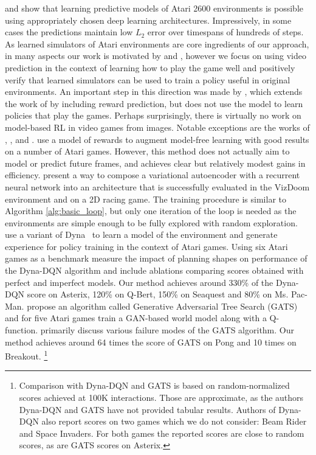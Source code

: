 \citet{video_prediction} and \citet{recurrent} show that learning predictive models of Atari 2600 environments is possible using appropriately chosen deep learning architectures. Impressively, in some cases the predictions maintain low $L_2$ error over timespans of hundreds of steps. 
As learned simulators of Atari environments are core ingredients of our approach, in many aspects our work is motivated by \citet{video_prediction} and \citet{recurrent}, however we focus on using video prediction in the context of learning how to play the game well and positively verify that learned simulators can be used to train a policy useful in original environments.
An important step in this direction was made by \citet{video_reward_prediction}, which extends the work of \citet{video_prediction} by including reward prediction, but does not use the model to learn policies that play the games.
Perhaps surprisingly, there is virtually no work on model-based RL in video games from images.
Notable exceptions are the works of
\citet{vpn}, \citet{world_models}, \citet{dyna_dqn} and \citet{gats}. \citet{vpn} use a model of rewards to augment model-free learning with good results on a number of Atari games. However, this method does not actually aim to model or predict future frames, and achieves clear but relatively modest gains in efficiency.
\citet{world_models} present a way to compose a variational autoencoder with a recurrent neural network into an architecture  
that is successfully evaluated in the VizDoom environment and on a 2D racing game. 
The training procedure is similar to  Algorithm \ref{alg:basic_loop}, but only one iteration of the loop is needed as the environments are simple enough to be fully explored with random exploration. \citet{dyna_dqn} use a variant of Dyna~\cite{dyna} to learn a model of the environment and generate experience for policy training in the context of Atari games. Using six Atari games as a benchmark \citet{dyna_dqn} measure the impact of planning shapes on performance of the Dyna-DQN algorithm and include ablations comparing scores obtained with perfect and imperfect models. Our method achieves around 330\% of the Dyna-DQN score on Asterix, 120\% on Q-Bert, 150\% on Seaquest and 80\% on Ms. Pac-Man. \cite{gats} propose an algorithm called Generative Adversarial Tree Search (GATS) and for five Atari games train a GAN-based world model along with a Q-function. \cite{gats} primarily discuss various failure modes of the GATS algorithm. Our method achieves around 64 times the score of GATS on Pong and 10 times on Breakout. \footnote{Comparison with Dyna-DQN and GATS is based on  random-normalized scores achieved at 100K interactions. Those are approximate, as the authors Dyna-DQN and GATS have not provided tabular results. Authors of Dyna-DQN also report scores on two games which we do not consider: Beam Rider and Space Invaders. For both games the reported scores are close to  random scores, as are GATS scores on Asterix.}

